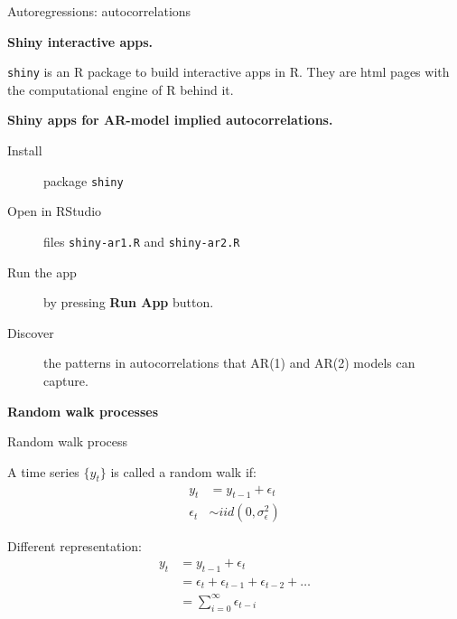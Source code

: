\documentclass[notes,blackandwhite,mathsans]{beamer}
\begin{document}
\begin{frame}{Autoregressions: autocorrelations}

\textbf{Shiny interactive apps.}

\smallskip \texttt{shiny} {\color{mcxs2}is an R package to build interactive apps in R. They are html pages with the computational engine of R behind it.}

\bigskip\textbf{Shiny apps for  AR-model implied autocorrelations.}

\smallskip
\begin{description}
\item[Install] {\color{mcxs2}package} \texttt{shiny}
\item[Open in RStudio] {\color{mcxs2}files} \texttt{shiny-ar1.R} {\color{mcxs2}and} \texttt{shiny-ar2.R}
\item[Run the app] {\color{mcxs2}by pressing} \textbf{Run App} {\color{mcxs2}button.}
\item[Discover] {\color{mcxs2}the patterns in autocorrelations that} AR(1) {\color{mcxs2}and} AR(2) {\color{mcxs2}models can capture.}
\end{description}

\end{frame}












{
\begin{frame}

\begin{adjustwidth}{-0.5cm}{0cm}
\vspace{8.3cm}\Large
\textbf{{\color{mcxs1}Random walk} {\color{mcxs2}processes}}
\end{adjustwidth}

\end{frame}
}





\begin{frame}{Random walk process}

{\color{mcxs2}A time series} $\{y_t\}$ {\color{mcxs2}is called a} {\color{mcxs2}random walk} if:
\begin{align*}
y_t &= y_{t-1} + \epsilon_t \\
\epsilon_t &\sim iid\left(0,\sigma_{\epsilon}^2\right)
\end{align*}

{\color{mcxs2}Different representation:}
\begin{align*}
y_t &= y_{t-1} + \epsilon_t \\
 &= \epsilon_t + \epsilon_{t-1} + \epsilon_{t-2} + \dots \\
 &= \sum_{i=0}^{\infty} \epsilon_{t-i}
\end{align*}

\end{frame}
\end{document}
